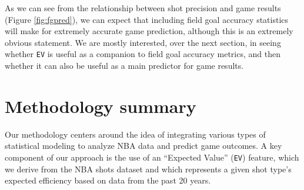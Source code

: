 \documentclass[
  12pt,
  a4paper,
]{article}
\let\origfigure\figure
\let\endorigfigure\endfigure
\renewenvironment{figure}[1][2] {
    \expandafter\origfigure\expandafter[H]
} {
    \endorigfigure
}
\begin{document}
As we can see from the relationship between shot precision and game results (Figure \ref{fig:fgpred}), we can expect that including field goal accuracy statistics will make for extremely accurate game prediction, although this is an extremely obvious statement. We are mostly interested, over the next section, in seeing whether \texttt{EV} is useful as a companion to field goal accuracy metrics, and then whether it can also be useful as a main predictor for game results.

\begin{figure}

{\centering {}

}

\caption{Role of shot precision in games predictions}\label{fig:fgpred}
\end{figure}

\hypertarget{methodology-summary}{%
\section{Methodology summary}\label{methodology-summary}}

Our methodology centers around the idea of integrating various types of statistical modeling to analyze NBA data and predict game outcomes. A key component of our approach is the use of an ``Expected Value'' (\texttt{EV}) feature, which we derive from the NBA shots dataset and which represents a given shot type's expected efficiency based on data from the past 20 years.
\end{document}
